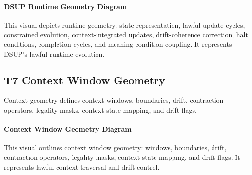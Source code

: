 \paragraph{DSUP Runtime Geometry Diagram}
This visual depicts runtime geometry: state representation, lawful update
cycles, constrained evolution, context-integrated updates, drift-coherence
correction, halt conditions, completion cycles, and meaning-condition coupling.
It represents DSUP’s lawful runtime evolution.


\begin{center}
\end{center}


\subsection{T7 Context Window Geometry}
Context geometry defines context windows, boundaries, drift, contraction
operators, legality masks, context-state mapping, and drift flags.

\paragraph{Context Window Geometry Diagram}
This visual outlines context window geometry: windows, boundaries, drift,
contraction operators, legality masks, context-state mapping, and drift flags.
It represents lawful context traversal and drift control.


